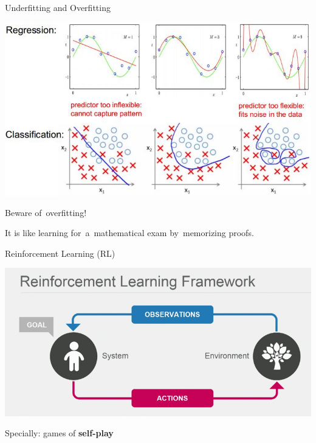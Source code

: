 \documentclass{beamer}
\begin{document}
  {
    \begin{frame}{Underfitting and Overfitting}
      \begin{center}
        \includegraphics[width=.75\textwidth]{../img/underfitting_and_overfitting.jpg}
        \pause
      \end{center}

      Beware of~overfitting!
      \pause

      It is like learning for~a~mathematical exam by~memorizing proofs.
    \end{frame}
  }

  {
    \begin{frame}{Reinforcement Learning (RL)}
      \begin{center}
        \includegraphics[width=\textwidth]{../img/RL_framework.png}
      \end{center}
      \pause
      
      Specially: games of \textbf{self-play}
    \end{frame}
  }

\end{document}
